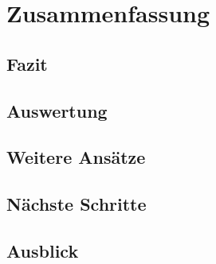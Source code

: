 \chapter{Zusammenfassung}

\section{Fazit}

\section{Auswertung}

\section{Weitere Ansätze}

\section{Nächste Schritte}

\section{Ausblick}
